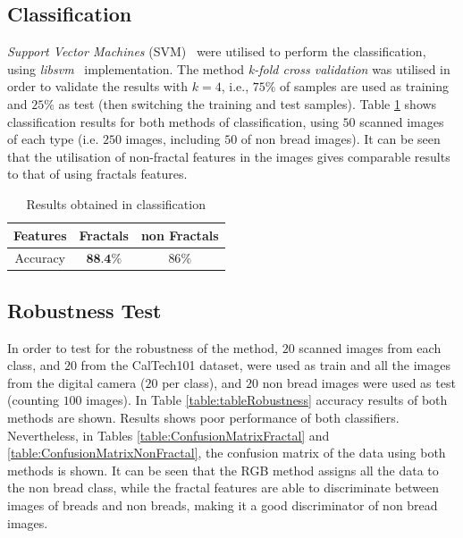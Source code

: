 \documentclass[oneside,a4paper,english,links]{amca}
\begin{document}
\subsection{Classification}
{\em Support Vector Machines} (SVM)~\cite{Boser92} were utilised to perform the classification, using {\em libsvm}~\cite{Chang2011} implementation.
The method {\em k-fold cross validation} was utilised in order to validate the results with $k = 4$, i.e., $75\%$ of samples are used as training and $25\%$ as test (then switching the training and test samples). Table \ref{table:tableFirstTest} shows classification results for both methods of classification, using $50$ scanned images of each type (i.e. $250$ images, including $50$ of non bread images). It can be seen that the utilisation of non-fractal features in the images gives comparable results to that of using fractals features.

\begin{table}[htb]
\centering
\begin{tabular}{|c|c|c|}
    \hline
    Features & Fractals & non Fractals\\
    \hline
    Accuracy  & $\textbf{88.4}\%$ & $86\%$\\
    \hline
\end{tabular}
\caption{Results obtained in classification}
\label{table:tableFirstTest}
\end{table}

\subsection{Robustness Test}
In order to test for the robustness of the method, $20$ scanned images from each class, and $20$ from the CalTech101 dataset, were used as train and all the images from the digital camera ($20$ per class), and $20$ non bread images were used as test (counting $100$ images). In Table \ref{table:tableRobustness} accuracy results of both methods are shown. Results shows poor performance of both classifiers. Nevertheless, in Tables \ref{table:ConfusionMatrixFractal} and \ref{table:ConfusionMatrixNonFractal}, the confusion matrix of the data using both methods is shown. It can be seen that the RGB method assigns all the data to the non bread class, while the fractal features are able to discriminate between images of breads and non breads, making it a good discriminator of non bread images.
\end{document}
